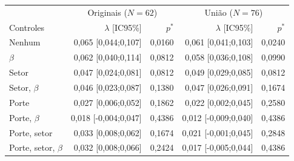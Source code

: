 \begin{tabular}{lrrrr}
\toprule
 & \multicolumn{2}{c}{Originais ($N=62$)} & \multicolumn{2}{c}{União ($N=76$)}\\ Controles & $\lambda$ [IC95\%] & $p^*$ & $\lambda$ [IC95\%] & $p^*$\\
\midrule
Nenhum & 0,065 [0,044;0,107] & 0,0160 & 0,061 [0,041;0,103] & 0,0240\\
$\beta$ & 0,062 [0,040;0,114] & 0,0812 & 0,058 [0,036;0,108] & 0,0990\\
Setor & 0,047 [0,024;0,081] & 0,0812 & 0,049 [0,029;0,085] & 0,0812\\
Setor, $\beta$ & 0,046 [0,023;0,087] & 0,1380 & 0,047 [0,026;0,091] & 0,1674\\
Porte & 0,027 [0,006;0,052] & 0,1862 & 0,022 [0,002;0,045] & 0,2580\\
Porte, $\beta$ & 0,018 [-0,004;0,047] & 0,4386 & 0,012 [-0,009;0,040] & 0,4386\\
Porte, setor & 0,033 [0,008;0,062] & 0,1674 & 0,021 [-0,001;0,045] & 0,2848\\
Porte, setor, $\beta$ & 0,032 [0,008;0,066] & 0,2424 & 0,017 [-0,005;0,044] & 0,4386\\
\bottomrule
\end{tabular}
